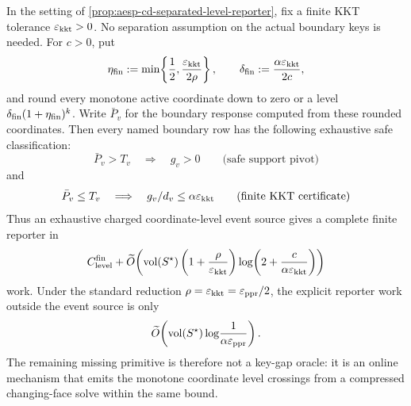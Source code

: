 \begin{corollary}
\label{cor:aesp-cd-finite-level-reporter}
In the setting of
\cref{prop:aesp-cd-separated-level-reporter}, fix a finite KKT tolerance
\(\varepsilon_{\mathrm{kkt}}>0\).  No separation assumption on the actual boundary keys is
needed.  For \(c>0\), put
\begin{equation*}
 \eta_{\rm fin}:=\min\!\left\{\frac12,
                 \frac{\varepsilon_{\mathrm{kkt}}}{2\rho}\right\},
 \qquad
 \delta_{\rm fin}:=\frac{\alpha\varepsilon_{\mathrm{kkt}}}{2c},
\end{equation*}
and round every monotone active coordinate down to zero or a level
\(\delta_{\rm fin}(1+\eta_{\rm fin})^k\).  Write \(\bar P_v\) for the
boundary response computed from these rounded coordinates.  Then every
named boundary row has the following exhaustive safe classification:
\begin{equation}
 \bar P_v>T_v
 \quad\Longrightarrow\quad g_v>0
 \qquad\text{(safe support pivot)}
 \label{eq:aesp-cd-finite-level-pivot}
\end{equation}
and
\begin{equation}
 \bar P_v\leq T_v
 \quad\Longrightarrow\quad
 g_v/d_v\leq\alpha\varepsilon_{\mathrm{kkt}}
 \qquad\text{(finite KKT certificate)}
 \label{eq:aesp-cd-finite-level-stop}
\end{equation}
Thus an exhaustive charged coordinate-level event source gives a complete
finite reporter in
\begin{equation}
 C_{\rm level}^{\rm fin}
 +\widetilde O\!\left(
  \operatorname{vol}(S^\star)
  \left(1+\frac{\rho}{\varepsilon_{\mathrm{kkt}}}\right)
  \log\!\left(2+\frac{c}{\alpha\varepsilon_{\mathrm{kkt}}}\right)
 \right)
 \label{eq:aesp-cd-finite-level-work}
\end{equation}
work.  Under the standard reduction
\(\rho=\varepsilon_{\mathrm{kkt}}=\varepsilon_{\mathrm{ppr}}/2\), the explicit reporter work outside the event
source is only
\begin{equation*}
 \widetilde O\!\left(
  \operatorname{vol}(S^\star)\log\!\frac1{\alpha\varepsilon_{\mathrm{ppr}}}
 \right).
\end{equation*}
The remaining missing primitive is therefore not a key-gap oracle: it is an
online mechanism that emits the monotone coordinate level crossings from a
compressed changing-face solve within the same bound.
\end{corollary}

